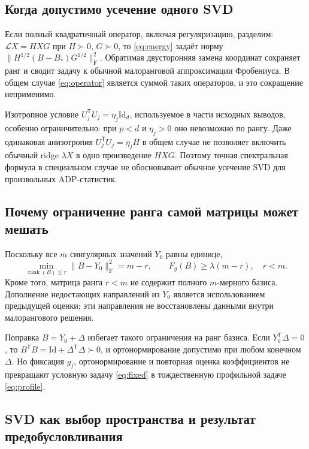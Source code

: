 \documentclass[11pt,a4paper]{article}
\numberwithin{equation}{section}
\newcommand{\Id}{\mathrm{Id}}
\newcommand{\T}{^{\mathsf T}}
\newcommand{\F}{_{\mathrm F}}
\DeclareMathOperator{\rank}{rank}
\begin{document}
\subsection{Когда допустимо усечение одного SVD}

Если полный квадратичный оператор, включая регуляризацию, разделим:
$\mathcal LX=H XG$ при $H\succ0$, $G\succ0$, то
\eqref{eq:energy} задаёт норму
$\|H^{1/2}(B-B_*)G^{1/2}\|\F^2$.
Обратимая двусторонняя замена координат сохраняет ранг и сводит
задачу к обычной малоранговой аппроксимации Фробениуса.
В общем случае \eqref{eq:operator} является суммой таких операторов,
и это сокращение неприменимо.

Изотропное условие $U_j\T U_j=\eta_j\Id_d$, используемое
в части исходных выводов, особенно ограничительно: при $p<d$
и $\eta_j>0$ оно невозможно по рангу. Даже одинаковая анизотропия
$U_j\T U_j=\eta_jH$ в общем случае не позволяет включить обычный
ridge $\lambda X$ в одно произведение $HXG$.
Поэтому точная спектральная формула в специальном случае не обосновывает
обычное усечение SVD для произвольных ADP-статистик.\cite{svd,unified,archiveaudit}

\subsection{Почему ограничение ранга самой матрицы может мешать}

Поскольку все $m$ сингулярных значений $Y_0$ равны единице,
\begin{equation}\label{eq:floor}
 \min_{\rank(B)\le r}\|B-Y_0\|\F^2=m-r,
 \qquad F_g(B)\ge\lambda(m-r),\quad r<m.
\end{equation}
Кроме того, матрица ранга $r<m$ не содержит полного $m$-мерного
базиса. Дополнение недостающих направлений из $Y_0$ является
использованием предыдущей оценки; эти направления не восстановлены
данными внутри малорангового решения.

Поправка $B=Y_0+\Delta$ избегает такого ограничения на ранг базиса.
Если $Y_0\T\Delta=0$, то $B\T B=\Id+\Delta\T\Delta\succ0$,
и ортонормирование допустимо при любом конечном $\Delta$.
Но фиксация $g_j$, ортонормирование и повторная оценка коэффициентов
не превращают условную задачу \eqref{eq:fixed} в тождественную
профильной задаче \eqref{eq:profile}.\cite{svd,unified}

\subsection{SVD как выбор пространства и результат предобусловливания}
\end{document}
